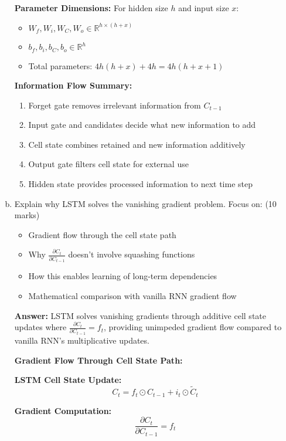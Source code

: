 \documentclass[12pt]{article}
\newcommand{\answer}[1]{{\color{answercolor}\textbf{Answer:} #1}}
\newcommand{\explanation}[1]{{\color{explanationcolor}#1}}
\begin{document}
\begin{enumerate}[(a)]
{    \textbf{Parameter Dimensions:}
    For hidden size $h$ and input size $x$:
    \begin{itemize}
        \item $W_f, W_i, W_C, W_o \in \mathbb{R}^{h \times (h+x)}$
        \item $b_f, b_i, b_C, b_o \in \mathbb{R}^h$
        \item Total parameters: $4h(h+x) + 4h = 4h(h+x+1)$
    \end{itemize}
    
    \textbf{Information Flow Summary:}
    \begin{enumerate}
        \item Forget gate removes irrelevant information from $C_{t-1}$
        \item Input gate and candidates decide what new information to add
        \item Cell state combines retained and new information additively
        \item Output gate filters cell state for external use
        \item Hidden state provides processed information to next time step
    \end{enumerate}
    }
    
    \item Explain why LSTM solves the vanishing gradient problem. Focus on: \hfill (10 marks)
    \begin{itemize}
        \item Gradient flow through the cell state path
        \item Why $\frac{\partial C_t}{\partial C_{t-1}}$ doesn't involve squashing functions
        \item How this enables learning of long-term dependencies
        \item Mathematical comparison with vanilla RNN gradient flow
    \end{itemize}
    
    \answer{LSTM solves vanishing gradients through additive cell state updates where $\frac{\partial C_t}{\partial C_{t-1}} = f_t$, providing unimpeded gradient flow compared to vanilla RNN's multiplicative updates.}
    
    \explanation{
    \textbf{Gradient Flow Through Cell State Path:}
    
    \textbf{LSTM Cell State Update:}
    $$C_t = f_t \odot C_{t-1} + i_t \odot \tilde{C}_t$$
    
    \textbf{Gradient Computation:}
    $$\frac{\partial C_t}{\partial C_{t-1}} = f_t$$
    
}
\end{enumerate}
\end{document}
